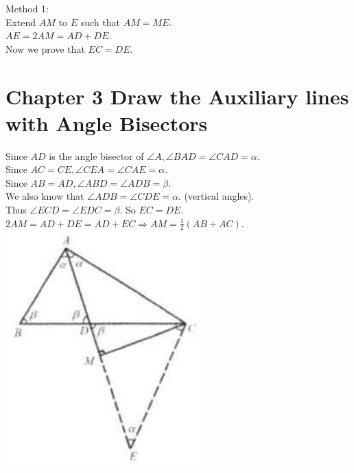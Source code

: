 \documentclass[10pt]{article}
\begin{document}
Method 1:\\
Extend \(A M\) to \(E\) such that \(A M=M E\).\\
\(A E=2 A M=A D+D E\).\\
Now we prove that \(E C=D E\).

\section*{Chapter 3 Draw the Auxiliary lines with Angle Bisectors}
Since \(A D\) is the angle bisector of \(\angle A, \angle B A D=\angle C A D=\alpha\).\\
Since \(A C=C E, \angle C E A=\angle C A E=\alpha\).\\
Since \(A B=A D, \angle A B D=\angle A D B=\beta\).\\
We also know that \(\angle A D B=\angle C D E=\alpha\). (vertical angles).\\
Thus \(\angle E C D=\angle E D C=\beta\). So \(E C=D E\).\\
\(2 A M=A D+D E=A D+E C \Rightarrow A M=\frac{1}{2}(A B+A C)\).\\
\includegraphics[max width=\textwidth, center]{2025_04_17_97bc1f7e44d93c271a88g-058(1)}
\end{document}

